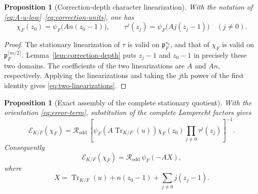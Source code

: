 \documentclass[11pt]{amsart}
\newtheorem{proposition}[theorem]{Proposition}
\theoremstyle{definition}
\theoremstyle{remark}
\newcommand{\p}{\mathfrak p}
\newcommand{\Tr}{\operatorname{Tr}}
\newcommand{\Err}{\mathcal E}
\begin{document}
\begin{proposition}[Correction-depth character linearization]
\label{prop:correction-linearization}
With the notation of
\eqref{eq:A-u-low}--\eqref{eq:correction-units}, one has
\begin{equation}\label{eq:two-linearizations}
 \chi_F(z_0)=\psi_F\bigl(An(z_0-1)\bigr),
 \qquad
 \tau^j(z_j)=\psi_F\bigl(Aj(z_j-1)\bigr)
 \quad(j\ne0).
\end{equation}
\end{proposition}

\begin{proof}
The stationary linearization of $\tau$ is valid on $\p_F^{s_0}$, and
that of $\chi_F$ is valid on
$\p_F^{\lceil m/2\rceil}$.  Lemma~\ref{lem:correction-depth} puts
$z_j-1$ and $z_0-1$ in precisely these two domains.  The coefficients of
the two linearizations are $A$ and $An$, respectively.  Applying the
linearizations and taking the $j$th power of the first identity gives
\eqref{eq:two-linearizations}.
\end{proof}

\begin{proposition}[Exact assembly of the complete stationary quotient]
\label{prop:exact-odd-assembly}
With the orientation \eqref{eq:error-term}, substitution of the complete
Lamprecht factors gives
\begin{equation}\label{eq:exact-assembly-odd}
 \Err_{K/F}(\chi_F)
 =\mathcal R_{\mathrm{odd}}\,
 \left[
 \psi_F(A \Tr_{K/F}(u))\chi_F(z_0)
 \prod_{j\ne0}\tau^j(z_j)
 \right]^{-1}.
\end{equation}
Consequently
\begin{equation}\label{eq:error-psiX}
 \Err_{K/F}(\chi_F)
 =\mathcal R_{\mathrm{odd}}\,\psi_F(-AX),
\end{equation}
where
\begin{equation}\label{eq:X-def}
 X=\Tr_{K/F}(u)+n(z_0-1)+\sum_{j\ne0}j(z_j-1).
\end{equation}
\end{proposition}
\end{document}
